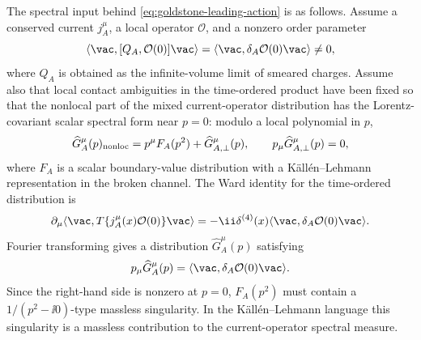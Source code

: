\begin{proposition}
\label{prop:goldstone-spectral-pole}
The spectral input behind \eqref{eq:goldstone-leading-action} is as follows.
Assume a conserved current \(j_A^\mu\), a local operator \(\mathcal O\), and a
nonzero order parameter
\begin{equation}
  \langle\vac,[Q_A,\mathcal O(0)]\vac\rangle
  =
  \langle\vac,\delta_A\mathcal O(0)\vac\rangle
  \ne0 ,
  \label{eq:goldstone-order-parameter}
\end{equation}
where \(Q_A\) is obtained as the infinite-volume limit of smeared charges.
Assume also that local contact ambiguities in the time-ordered product have
been fixed so that the nonlocal part of the mixed current-operator distribution
has the Lorentz-covariant scalar spectral form near \(p=0\): modulo a local
polynomial in \(p\),
\[
  \widehat G_A^\mu(p)_{\rm nonloc}
  =
  p^\mu F_A(p^2)
  +
  \widehat G_{A,\perp}^\mu(p),
  \qquad
  p_\mu\widehat G_{A,\perp}^\mu(p)=0,
\]
where \(F_A\) is a scalar boundary-value distribution with a
K\"all\'en--Lehmann representation in the broken channel.
The Ward identity for the time-ordered distribution is
\begin{equation}
  \partial_\mu
  \langle\vac,T\{j_A^\mu(x)\mathcal O(0)\}\vac\rangle
  =
  -\ii\delta^{(4)}(x)
  \langle\vac,\delta_A\mathcal O(0)\vac\rangle .
  \label{eq:goldstone-ward-distribution}
\end{equation}
Fourier transforming gives a distribution \(\widehat G_A^\mu(p)\) satisfying
\[
  p_\mu\widehat G_A^\mu(p)
  =
  \langle\vac,\delta_A\mathcal O(0)\vac\rangle .
\]
Since the right-hand side is nonzero at \(p=0\), \(F_A(p^2)\) must contain a
\(1/(p^2-\ii0)\)-type massless singularity.  In the K\"all\'en--Lehmann
language this singularity is a massless contribution to the
current-operator spectral measure.
\end{proposition}


